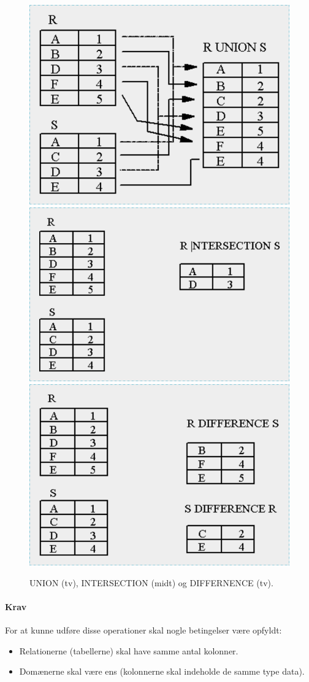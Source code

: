 \begin{figure}[H]
	\centering
	\includegraphics[width=.33\textwidth]{figs/spm6/unionexample}\hfill
	\includegraphics[width=.33\textwidth]{figs/spm6/intersectionexample}\hfill
	\includegraphics[width=.33\textwidth]{figs/spm6/differenceexample}	
	\caption{UNION (tv), INTERSECTION (midt) og DIFFERNENCE (tv).}
	\label{fig:union_intersection_difference_example}	
\end{figure}

\paragraph{Krav}

For at kunne udføre disse operationer skal nogle betingelser være opfyldt: 

\begin{itemize}
	\item Relationerne (tabellerne) skal have samme antal kolonner.
	\item Domænerne skal være ens (kolonnerne skal indeholde de samme type data).
\end{itemize}
